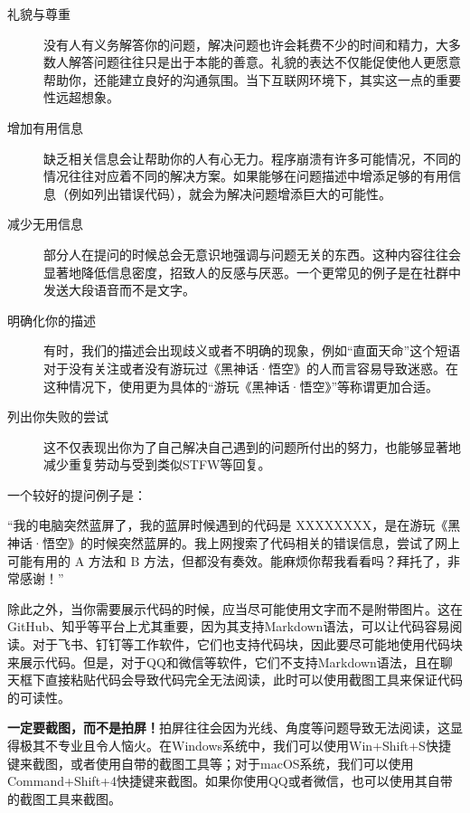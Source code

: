 \begin{description}
  \item[礼貌与尊重] 没有人有义务解答你的问题，解决问题也许会耗费不少的时间和精力，大多数人解答问题往往只是出于本能的善意。礼貌的表达不仅能促使他人更愿意帮助你，还能建立良好的沟通氛围。当下互联网环境下，其实这一点的重要性远超想象。
  \item[增加有用信息] 缺乏相关信息会让帮助你的人有心无力。程序崩溃有许多可能情况，不同的情况往往对应着不同的解决方案。如果能够在问题描述中增添足够的有用信息（例如列出错误代码），就会为解决问题增添巨大的可能性。
  \item[减少无用信息] 部分人在提问的时候总会无意识地强调与问题无关的东西。这种内容往往会显著地降低信息密度，招致人的反感与厌恶。一个更常见的例子是在社群中发送大段语音而不是文字。
  \item[明确化你的描述] 有时，我们的描述会出现歧义或者不明确的现象，例如“直面天命”这个短语对于没有关注或者没有游玩过《黑神话·悟空》的人而言容易导致迷惑。在这种情况下，使用更为具体的“游玩《黑神话·悟空》”等称谓更加合适。
  \item[列出你失败的尝试] 这不仅表现出你为了自己解决自己遇到的问题所付出的努力，也能够显著地减少重复劳动与受到类似STFW等回复。
\end{description}

一个较好的提问例子是：

“我的电脑突然蓝屏了，我的蓝屏时候遇到的代码是 XXXXXXXX，是在游玩《黑神话·悟空》的时候突然蓝屏的。我上网搜索了代码相关的错误信息，尝试了网上可能有用的 A 方法和 B 方法，但都没有奏效。能麻烦你帮我看看吗？拜托了，非常感谢！”

除此之外，当你需要展示代码的时候，应当尽可能使用文字而不是附带图片。这在GitHub、知乎等平台上尤其重要，因为其支持Markdown语法，可以让代码容易阅读。对于飞书、钉钉等工作软件，它们也支持代码块，因此要尽可能地使用代码块来展示代码。但是，对于QQ和微信等软件，它们不支持Markdown语法，且在聊天框下直接粘贴代码会导致代码完全无法阅读，此时可以使用截图工具来保证代码的可读性。

\textbf{一定要截图，而不是拍屏！}拍屏往往会因为光线、角度等问题导致无法阅读，这显得极其不专业且令人恼火。在Windows系统中，我们可以使用Win+Shift+S快捷键来截图，或者使用自带的截图工具等；对于macOS系统，我们可以使用Command+Shift+4快捷键来截图。如果你使用QQ或者微信，也可以使用其自带的截图工具来截图。